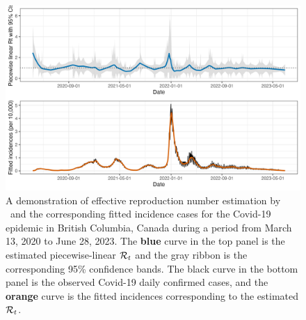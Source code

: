 \begin{figure}[tb]
    \centering
    \includegraphics[width=.99\textwidth]{fig/intro-fig.png}
    \caption{A demonstration of effective reproduction number estimation 
    by \RtEstim\ and the corresponding fitted incidence cases for the Covid-19 epidemic 
    in British Columbia, Canada during a period from March 13, 2020 to June 28, 2023. 
    The \textcolor{customblue}{\textbf{blue}} curve in the top panel is the estimated piecewise-linear $\mathcal{R}_t$ and the 
    gray ribbon is the corresponding 95\% confidence bands. 
    The black curve in the bottom panel is the observed Covid-19 daily confirmed 
    cases, and the \textcolor{customorange}{\textbf{orange}} curve is the fitted incidences corresponding to the 
    estimated $\mathcal{R}_t$.}
    \label{fig:intro-fig}
\end{figure}

